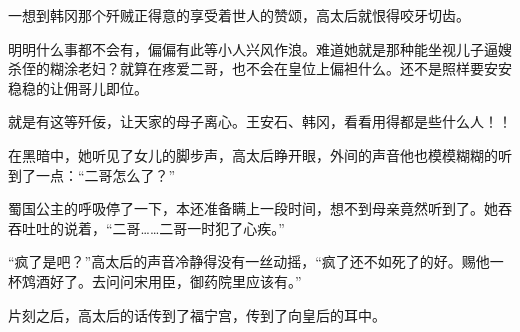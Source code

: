 一想到韩冈那个歼贼正得意的享受着世人的赞颂，高太后就恨得咬牙切齿。

明明什么事都不会有，偏偏有此等小人兴风作浪。难道她就是那种能坐视儿子逼嫂杀侄的糊涂老妇？就算在疼爱二哥，也不会在皇位上偏袒什么。还不是照样要安安稳稳的让佣哥儿即位。

就是有这等歼佞，让天家的母子离心。王安石、韩冈，看看用得都是些什么人！！

在黑暗中，她听见了女儿的脚步声，高太后睁开眼，外间的声音他也模模糊糊的听到了一点：“二哥怎么了？”

蜀国公主的呼吸停了一下，本还准备瞒上一段时间，想不到母亲竟然听到了。她吞吞吐吐的说着，“二哥……二哥一时犯了心疾。”

“疯了是吧？”高太后的声音冷静得没有一丝动摇，“疯了还不如死了的好。赐他一杯鸩酒好了。去问问宋用臣，御药院里应该有。”

片刻之后，高太后的话传到了福宁宫，传到了向皇后的耳中。


